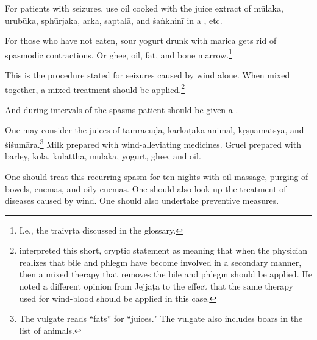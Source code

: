 \begin{translation}
For patients with seizures, use
oil cooked with the juice extract of 
\gls{mūlaka}, 
\gls{urubūka},
\gls{sphūrjaka}, 
\gls{arka},
\gls{saptalā}, and 
\gls{śaṅkhinī} in a
, etc.
   
For those who have not eaten, sour yogurt drunk with \gls{marica}
gets rid of spasmodic contractions.  Or ghee,
    oil, fat, and bone marrow.\footnote{I.e., the \gls{traivṛta} discussed in the 
    glossary.}
%    

This is the procedure stated for seizures caused by wind alone.
When mixed together, a mixed treatment should be 
applied.\footnote{ interpreted this short, cryptic
    statement as meaning that when the physician realizes that bile and
    phlegm have become involved in a secondary manner, then a mixed 
    therapy that removes the bile and phlegm should be applied.  He noted a
    different opinion from Jejjaṭa to the effect that the same therapy used for
    wind-blood should be applied in this case.}

And during intervals of the spasms patient should be given a
.

One may consider the juices of 
\gls{tāmracūḍa}, 
\gls{karkaṭaka-animal}, 
\gls{kṛṣṇamatsya}, and
\gls{śiśumāra}.\footnote{The vulgate reads “fats” for “juices."  The vulgate
    also includes boars in the list of animals.} Milk
    prepared with wind-alleviating medicines. Gruel prepared with barley,
    \gls{kola}, \gls{kulattha}, \gls{mūlaka}, yogurt, ghee, and oil.
  
\newpage
\begin{tt}
    \raggedright
    \bigskip

One should treat this recurring spasm for ten nights with oil massage,
purging of bowels, enemas, and oily enemas. One should also look up
the treatment of diseases caused by wind. One should also undertake
preventive measures.

\item[19]


\end{tt}
\end{translation}
